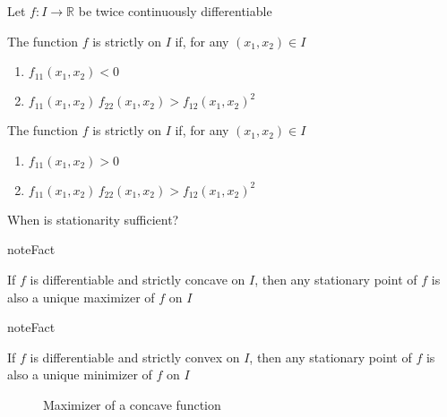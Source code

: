 \documentclass[letterpaper,10pt,english]{jupyterBook}
\begin{document}
\sphinxAtStartPar
Let \(f \colon I \to \mathbb{R}\) be twice continuously differentiable

\sphinxAtStartPar
The function \(f\) is strictly  on \(I\) if, for any \((x_1, x_2) \in I\)
\begin{enumerate}
%
\item {} 
\sphinxAtStartPar
\(f_{11}(x_1, x_2) < 0\)

\item {} 
\sphinxAtStartPar
\(f_{11}(x_1, x_2) \, f_{22}(x_1, x_2) >  f_{12}(x_1, x_2)^2\)

\end{enumerate}

\sphinxAtStartPar
The function \(f\) is strictly  on \(I\) if, for any \((x_1, x_2) \in I\)
\begin{enumerate}
%
\item {} 
\sphinxAtStartPar
\(f_{11}(x_1, x_2) > 0\)

\item {} 
\sphinxAtStartPar
\(f_{11}(x_1, x_2) \, f_{22}(x_1, x_2) >  f_{12}(x_1, x_2)^2\)

\end{enumerate}

\sphinxAtStartPar
When is stationarity sufficient?

\begin{sphinxadmonition}{note}{Fact}

\sphinxAtStartPar
If \(f\) is differentiable and strictly concave on \(I\), then any
stationary point of \(f\) is also a unique maximizer of \(f\) on \(I\)
\end{sphinxadmonition}

\begin{sphinxadmonition}{note}{Fact}

\sphinxAtStartPar
If \(f\) is differentiable and strictly convex on \(I\), then any
stationary point of \(f\) is also a unique minimizer of \(f\) on \(I\)
\end{sphinxadmonition}

\begin{figure}[htbp]
\centering
\capstart

\noindent{}
\caption{Maximizer of a concave function}\label{\detokenize{02.optimization_intro:id17}}\end{figure}
\end{document}
